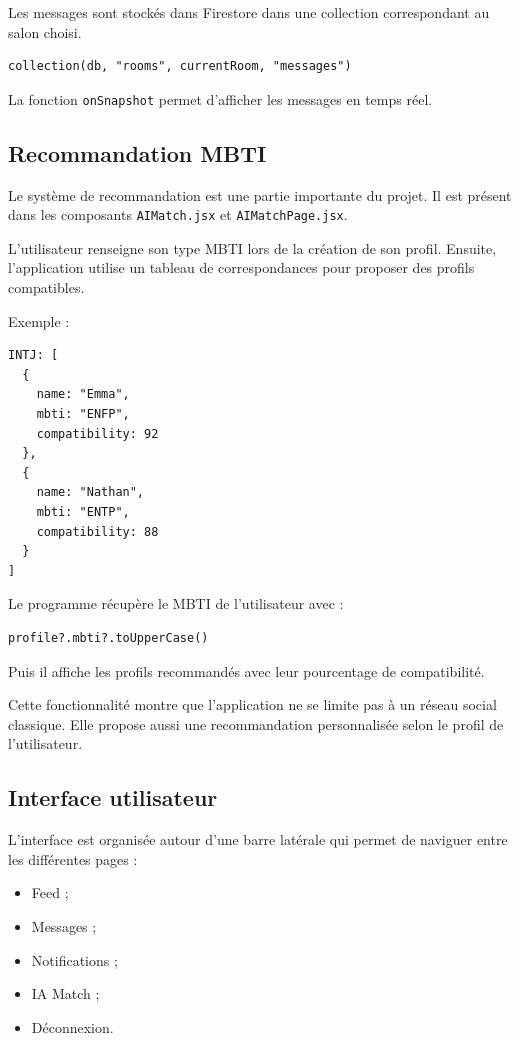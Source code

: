 \documentclass[a4paper, 12pt, twoside]{article}
\begin{document}
Les messages sont stockés dans Firestore dans une collection correspondant au salon choisi.

\begin{lstlisting}
collection(db, "rooms", currentRoom, "messages")
\end{lstlisting}

La fonction \texttt{onSnapshot} permet d'afficher les messages en temps réel.

\subsection{Recommandation MBTI}

Le système de recommandation est une partie importante du projet. 
Il est présent dans les composants \texttt{AIMatch.jsx} et \texttt{AIMatchPage.jsx}.

L'utilisateur renseigne son type MBTI lors de la création de son profil. 
Ensuite, l'application utilise un tableau de correspondances pour proposer des profils compatibles.

Exemple :

\begin{lstlisting}
INTJ: [
  {
    name: "Emma",
    mbti: "ENFP",
    compatibility: 92
  },
  {
    name: "Nathan",
    mbti: "ENTP",
    compatibility: 88
  }
]
\end{lstlisting}

Le programme récupère le MBTI de l'utilisateur avec :

\begin{lstlisting}
profile?.mbti?.toUpperCase()
\end{lstlisting}

Puis il affiche les profils recommandés avec leur pourcentage de compatibilité.

Cette fonctionnalité montre que l'application ne se limite pas à un réseau social classique. 
Elle propose aussi une recommandation personnalisée selon le profil de l'utilisateur.

\subsection{Interface utilisateur}

L'interface est organisée autour d'une barre latérale qui permet de naviguer entre les différentes pages :

\begin{itemize}
    \item Feed ;
    \item Messages ;
    \item Notifications ;
    \item IA Match ;
    \item Déconnexion.
\end{itemize}
\end{document}

